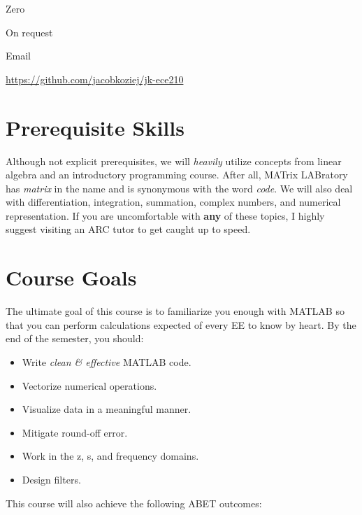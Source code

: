 \documentclass{article}
\begin{document}
\noindent
{} Zero

\noindent
{} On request

\noindent
{} Email

\noindent
{} \url{https://github.com/jacobkoziej/jk-ece210}

\section{Prerequisite Skills}

Although not explicit prerequisites, we will \emph{heavily} utilize
concepts from linear algebra and an introductory programming course.
After all, MATrix LABratory has \emph{matrix} in the name and is
synonymous with the word \emph{code}.  We will also deal with
differentiation, integration, summation, complex numbers, and numerical
representation.  If you are uncomfortable with \textbf{any} of these
topics, I highly suggest visiting an ARC tutor to get caught up to
speed.

\section{Course Goals}

The ultimate goal of this course is to familiarize you enough with
MATLAB so that you can perform calculations expected of every EE to know
by heart.  By the end of the semester, you should:

\begin{itemize}
	\item
		Write \emph{clean \& effective} MATLAB code.

	\item
		Vectorize numerical operations.

	\item
		Visualize data in a meaningful manner.

	\item
		Mitigate round-off error.

	\item
		Work in the z, s, and frequency domains.

	\item
		Design filters.
\end{itemize}

\noindent
This course will also achieve the following ABET outcomes:
\end{document}
